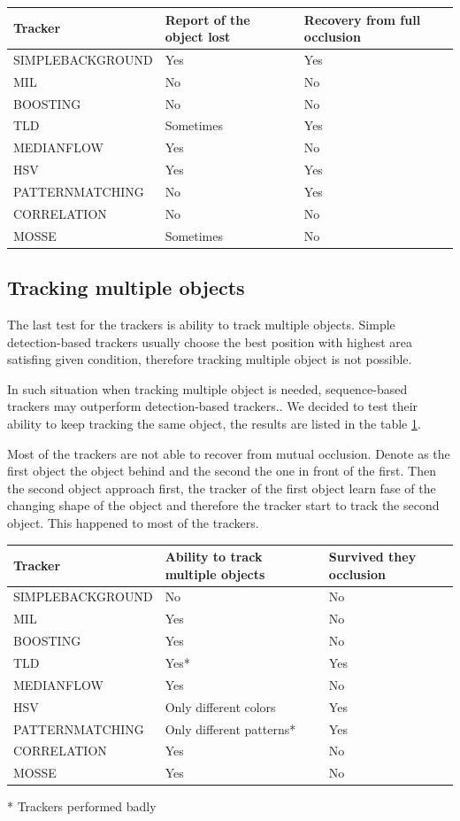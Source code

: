 \begin{table}
\centering
\begin{tabular}{l|l|l}
Tracker & Report of the object lost & Recovery from full occlusion \\
\hline
SIMPLEBACKGROUND & Yes & Yes \\
MIL & No & No \\
BOOSTING & No & No \\
TLD & Sometimes & Yes \\
MEDIANFLOW & Yes & No \\
HSV & Yes & Yes \\
PATTERNMATCHING & No & Yes \\
CORRELATION & No & No \\
MOSSE & Sometimes & No \\
\end{tabular}
\end{table}

\subsection{Tracking multiple objects}

The last test for the trackers is ability to track multiple objects. Simple
detection-based trackers usually choose the best position with highest area
satisfing given condition, therefore tracking multiple object is not possible.

In such situation when tracking multiple object is needed, sequence-based
trackers may outperform detection-based trackers.. We decided to test their
ability to keep tracking the same object, the results are listed in the table
\ref{table:multiple-objects}.

Most of the trackers are not able to recover from mutual occlusion. Denote as
the first object the object behind and the second the one in front of the
first. Then the second object approach first, the tracker of the first object
learn fase of the changing shape of the object and therefore the tracker start
to track the second object. This happened to most of the trackers.

\begin{table}
\centering
\begin{tabular}{l|l|l}
Tracker & Ability to track multiple objects & Survived they occlusion\\
\hline
SIMPLEBACKGROUND & No & No \\
MIL & Yes & No \\
BOOSTING & Yes &  No\\
TLD & Yes* & Yes \\
MEDIANFLOW & Yes & No \\
HSV & Only different colors & Yes \\
PATTERNMATCHING & Only different patterns* & Yes \\
CORRELATION & Yes & No \\
MOSSE & Yes & No \\
\end{tabular}
\label{table:multiple-objects}
\end{table}
* Trackers performed badly

